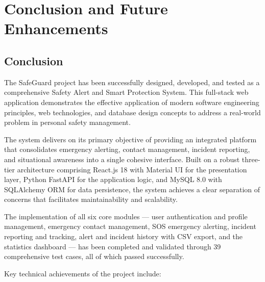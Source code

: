 \chapter{Conclusion and Future Enhancements}

\section{Conclusion}

The SafeGuard project has been successfully designed, developed, and tested as a comprehensive Safety Alert and Smart Protection System. This full-stack web application demonstrates the effective application of modern software engineering principles, web technologies, and database design concepts to address a real-world problem in personal safety management.

The system delivers on its primary objective of providing an integrated platform that consolidates emergency alerting, contact management, incident reporting, and situational awareness into a single cohesive interface. Built on a robust three-tier architecture comprising React.js 18 with Material UI for the presentation layer, Python FastAPI for the application logic, and MySQL 8.0 with SQLAlchemy ORM for data persistence, the system achieves a clear separation of concerns that facilitates maintainability and scalability.

The implementation of all six core modules --- user authentication and profile management, emergency contact management, SOS emergency alerting, incident reporting and tracking, alert and incident history with CSV export, and the statistics dashboard --- has been completed and validated through 39 comprehensive test cases, all of which passed successfully.

Key technical achievements of the project include:

